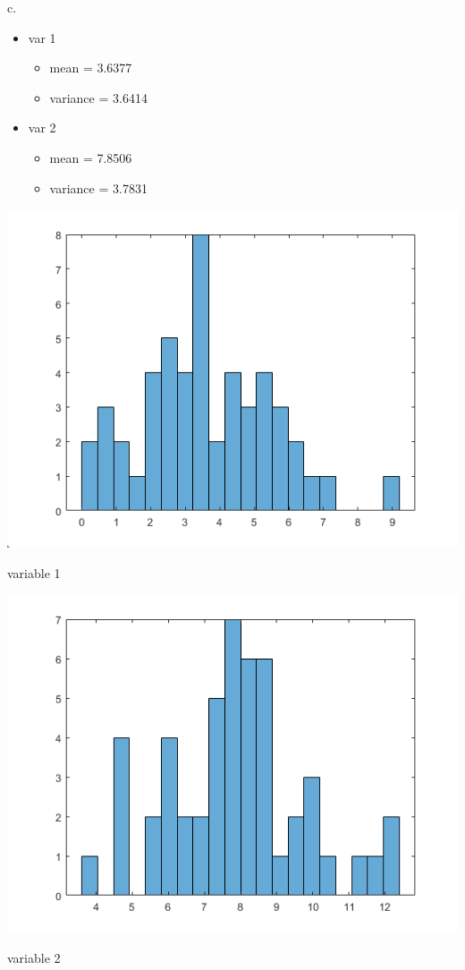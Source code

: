 \documentclass[a4paper]{article}
\begin{document}
c. 
\begin{itemize}
    \item var 1
    \begin{itemize}
        \item mean = 3.6377
        \item variance = 3.6414
    \end{itemize}
    \item var 2
    \begin{itemize}
        \item mean = 7.8506
        \item variance = 3.7831
    \end{itemize}
\end{itemize}


\begin{center}
    \includegraphics[scale=1]{1c-1.png}
    \caption{variable 1}
\end{center}


\begin{center}
    \includegraphics[scale=1]{1c-2.png}
    \caption{variable 2}
\end{center}
\end{document}
